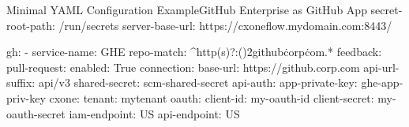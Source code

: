 \begin{code}{Minimal YAML Configuration Example}{GitHub Enterprise as GitHub App}{}
secret-root-path: /run/secrets
server-base-url: https://cxoneflow.mydomain.com:8443/

gh:
    - service-name: GHE
      repo-match: ^http(s)?:(\/){2}github\.corp\.com.*
      feedback:
        pull-request:
          enabled: True
      connection:
        base-url: https://github.corp.com
        api-url-suffix: api/v3
        shared-secret: scm-shared-secret
        api-auth:
          app-private-key: ghe-app-priv-key
      cxone:
        tenant: mytenant
        oauth:
          client-id: my-oauth-id
          client-secret: my-oauth-secret
        iam-endpoint: US
        api-endpoint: US
\end{code}
